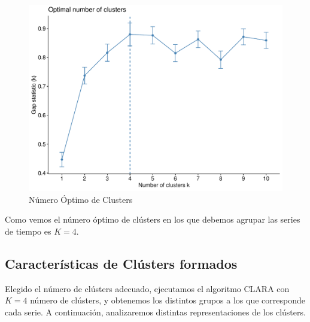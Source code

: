 \documentclass[12pt,oneside]{book}\usepackage[]{graphicx}\usepackage[]{color}
\theoremstyle{definition} %
\begin{document}
\begin{figure}[H]
\centering
\includegraphics[scale=0.65]{Resultados/4_k_optimo_clusters}
\caption{Número Óptimo de Clusters }\label{fig:k_opt}
\end{figure}

Como vemos el número óptimo de clústers en los que debemos agrupar las series de tiempo es $K=4$.


\subsection{Características de Clústers formados}
Elegido el número de clústers adecuado, ejecutamos el algoritmo CLARA con $K=4$ número de clústers, y obtenemos los distintos grupos a los que corresponde cada serie. A continuación, analizaremos distintas representaciones de los clústers.
\end{document}
